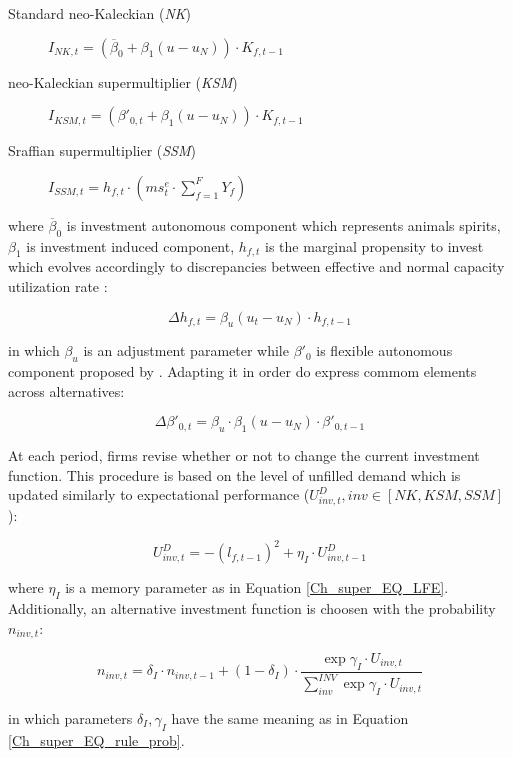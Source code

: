 \documentclass{SelfArx}
\begin{document}
\begin{description}
\item[{Standard neo-Kaleckian  (\emph{NK})}] \(I_{NK,t} = \left(\overline{\beta}_{0} + \beta_{1}(u - u_{N})\right)\cdot K_{f,t-1}\)
\item[{neo-Kaleckian supermultiplier (\emph{KSM})}] \(I_{KSM,t} = \left(\beta'_{0,t} + \beta_{1}(u - u_{N})\right)\cdot K_{f,t-1}\)
\item[{Sraffian supermultiplier (\emph{SSM})}] \(I_{SSM,t} = h_{f,t}\cdot \left(ms^{e}_{t}\cdot \sum_{f=1}^{F}Y_{f}\right)\)
\end{description}
where \(\overline{\beta}_{0}\) is investment autonomous component which represents animals spirits, \(\beta_{1}\) is investment induced component, \(h_{f,t}\) is the marginal propensity to invest which evolves accordingly to discrepancies between effective and normal capacity utilization rate \cite{serrano_1995_Long,serrano_2017_Sraffian}:
\begin{latex}
\begin{equation}
\Delta h_{f,t} = \beta_{u}(u_{t} - u_{N})\cdot h_{f,t-1}
\end{equation}
\end{latex}
in which \(\beta_{u}\) is an adjustment parameter while \(\beta'_{0}\) is flexible autonomous component proposed by \textcite{allain_2015_Tackling}.
Adapting it in order do express commom elements across alternatives:
\begin{latex}
\begin{equation}
\Delta \beta'_{0,t} = \beta_{u}\cdot\beta_{1}(u - u_{N})\cdot \beta'_{0,t-1}
\end{equation}
\end{latex}


At each period, firms revise whether or not to change the current investment function.
This procedure is based on the level of unfilled demand which is updated similarly to expectational performance (\(U^{D}_{inv,t}, inv \in [NK, KSM, SSM]\)):
\begin{latex}
\begin{equation}
U^{D}_{inv,t} = - (l_{f,t-1})^{2} + \eta_{I}\cdot U^{D}_{inv,t-1}
\end{equation}
\end{latex}
where \(\eta_{I}\) is a memory parameter as in Equation \ref{Ch_super_EQ_LFE}.
Additionally, an alternative investment function is choosen with the probability \(n_{inv,t}\):


\begin{latex}
\begin{equation}
\label{Ch_super_EQ_inv_prob}
n_{inv,t} = \delta_{I}\cdot n_{inv,t-1} + (1-\delta_{I})\cdot \frac{\exp{\gamma_{I}\cdot U_{inv,t}}}{\sum_{inv}^{INV}\exp{\gamma_{I}\cdot U_{inv,t}}}
\end{equation}
\end{latex}
in which parameters \(\delta_{I}, \gamma_{I}\) have the same meaning as in Equation \ref{Ch_super_EQ_rule_prob}.
\end{document}
